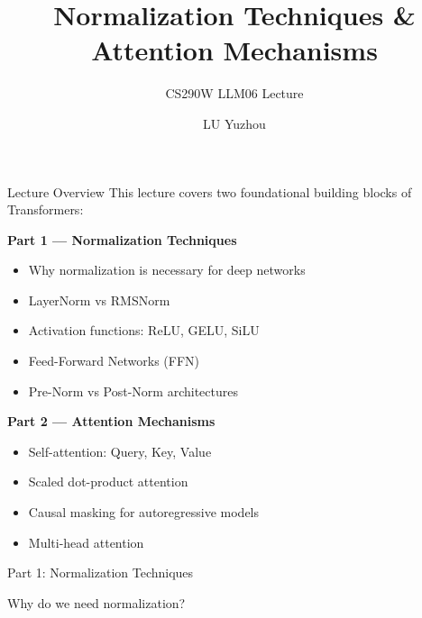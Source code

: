 \documentclass[aspectratio=169,10pt]{beamer}
\title{Normalization Techniques \& Attention Mechanisms}
\subtitle{CS290W LLM06 Lecture}
\author{LU Yuzhou}
\date{}
\begin{document}
\frame{\titlepage}

\begin{frame}{Lecture Overview}
	This lecture covers two foundational building blocks of Transformers:

	\vspace{0.3cm}
	\textbf{Part 1 — Normalization Techniques}
	\begin{itemize}
		\item Why normalization is necessary for deep networks
		\item LayerNorm vs RMSNorm
		\item Activation functions: ReLU, GELU, SiLU
		\item Feed-Forward Networks (FFN)
		\item Pre-Norm vs Post-Norm architectures
	\end{itemize}

	\vspace{0.3cm}
	\textbf{Part 2 — Attention Mechanisms}
	\begin{itemize}
		\item Self-attention: Query, Key, Value
		\item Scaled dot-product attention
		\item Causal masking for autoregressive models
		\item Multi-head attention
	\end{itemize}
\end{frame}


\begin{frame}{Part 1: Normalization Techniques}
	\begin{center}
		\Large Why do we need normalization?
	\end{center}
\end{frame}
\end{document}
